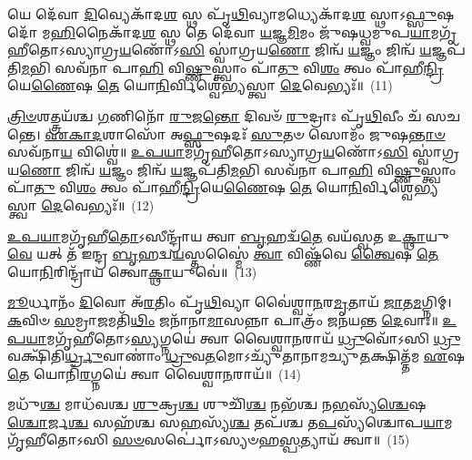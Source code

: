{\anuvakamend[{𑌤𑍞 𑌷𑌡𑍍𑌵𑌿𑍞᳴𑌶𑌤𑌿𑌃}]}%

𑌯𑍇 𑌦𑍇᳴𑌵𑌾 \ul{𑌦𑌿}\-𑌵𑍍𑌯𑍇𑌕𑌾᳴\-𑌦\-\ul{𑌶} 𑌸𑍍𑌥 𑌪𑍃᳴\-\ul{𑌥𑌿}\-𑌵𑍍𑌯𑌾𑌮𑌧𑍍𑌯𑍇𑌕𑌾᳴\-𑌦\-\ul{𑌶} 𑌸𑍍𑌥𑌾\-𑌽\-\ul{𑌫𑍍𑌸𑍁}\-𑌷𑌦𑍋᳴ 𑌮\-\ul{𑌹𑌿}\-𑌨𑍈𑌕𑌾᳴\-𑌦\-\ul{𑌶} 𑌸𑍍𑌥 𑌤𑍇 𑌦𑍇᳴𑌵𑌾 \ul{𑌯}\-𑌜𑍍𑌞\-\ul{𑌮𑌿}\-𑌮𑌂 𑌜𑍁᳴𑌷𑌧𑍍𑌵𑌮𑍁𑌪\-\ul{𑌯𑌾}\-𑌮𑌗𑍃᳴𑌹𑍀𑌤𑍋\-𑌽𑌸𑍍𑌯𑌾𑌗𑍍𑌰\-\ul{𑌯}\-𑌣𑍋᳴\-𑌽\-\ul{𑌸𑌿} 𑌸𑍍𑌵𑌾॑𑌗𑍍𑌰𑌯\-\ul{𑌣𑍋} 𑌜𑌿𑌨𑍍𑌵᳴ \ul{𑌯}\-𑌜𑍍𑌞𑌂 𑌜𑌿𑌨𑍍𑌵᳴ \ul{𑌯}\-𑌜𑍍𑌞𑌪᳴𑌤𑌿\-\ul{𑌮}\-𑌭𑌿 𑌸𑌵᳴𑌨𑌾 𑌪𑌾\-\ul{𑌹𑌿} 𑌵𑌿\-\ul{𑌷𑍍𑌣𑍁}\-𑌸𑍍𑌤𑍍𑌵𑌾𑌂 𑌪𑌾᳴\-\ul{𑌤𑍁} 𑌵𑌿\-\ul{𑌶𑌂} 𑌤𑍍𑌵𑌂 𑌪𑌾᳴𑌹𑍀\-\ul{𑌨𑍍𑌦𑍍𑌰𑌿}\-𑌯𑍇\-\ul{𑌣𑍈}\-𑌷 \ul{𑌤𑍇} 𑌯𑍋\-\ul{𑌨𑌿}\-𑌰𑍍𑌵𑌿𑌶𑍍𑌵𑍇॑𑌭𑍍𑌯𑌸𑍍𑌤𑍍𑌵𑌾 \ul{𑌦𑍇}\-𑌵𑍇𑌭𑍍𑌯𑌃᳴॥~(11)

{\anuvakamend[{𑌯𑍇 𑌦𑍇᳴\-\ul{𑌵𑌾}\-𑌸𑍍𑌤𑍍𑌰𑌿𑌚᳴𑌤𑍍𑌵𑌾𑌰𑌿𑍞𑌶𑌤𑍍}]}%

\-\ul{𑌤𑍍𑌰𑌿}\-\-\ul{𑍞}\-𑌶𑌤𑍍𑌤𑍍𑌰𑌯᳴𑌶𑍍𑌚 \ul{𑌗}\-𑌣𑌿𑌨𑍋᳴ \ul{𑌰𑍁}\-𑌜\-\ul{𑌨𑍍𑌤𑍋} 𑌦𑌿𑌵𑍞᳴ \ul{𑌰𑍁}\-𑌦𑍍𑌰𑌾𑌃 𑌪𑍃᳴\-\ul{𑌥𑌿}\-𑌵𑍀𑌂 𑌚᳴ 𑌸𑌚𑌨𑍍𑌤𑍇। \ul{𑌏}\-\-\ul{𑌕𑌾}\-\-\ul{𑌦}\-𑌶𑌾𑌸𑍋᳴ 𑌅\-\ul{𑌫𑍍𑌸𑍁}\-𑌷𑌦𑌃᳴ \ul{𑌸𑍁}\-𑌤𑍞 𑌸𑍋𑌮𑌂᳴ 𑌜𑍁𑌷\-\ul{𑌨𑍍𑌤𑌾}\-\-\ul{𑍞} 𑌸𑌵᳴𑌨𑌾\-\ul{𑌯} 𑌵𑌿𑌶𑍍𑌵𑍇॑॥ \ul{𑌉}\-\-\ul{𑌪}\-\-\ul{𑌯𑌾}\-𑌮𑌗𑍃᳴𑌹𑍀𑌤𑍋\-𑌽𑌸𑍍𑌯𑌾𑌗𑍍𑌰\-\ul{𑌯}\-𑌣𑍋᳴\-𑌽\-\ul{𑌸𑌿} 𑌸𑍍𑌵𑌾॑𑌗𑍍𑌰𑌯\-\ul{𑌣𑍋} 𑌜𑌿𑌨𑍍𑌵᳴ \ul{𑌯}\-𑌜𑍍𑌞𑌂 𑌜𑌿𑌨𑍍𑌵᳴ \ul{𑌯}\-𑌜𑍍𑌞𑌪᳴𑌤𑌿\-\ul{𑌮}\-𑌭𑌿 𑌸𑌵᳴𑌨𑌾 𑌪𑌾\-\ul{𑌹𑌿} 𑌵𑌿\-\ul{𑌷𑍍𑌣𑍁}\-𑌸𑍍𑌤𑍍𑌵𑌾𑌂 𑌪𑌾᳴\-\ul{𑌤𑍁} 𑌵𑌿\-\ul{𑌶𑌂} 𑌤𑍍𑌵𑌂 𑌪𑌾᳴𑌹𑍀\-\ul{𑌨𑍍𑌦𑍍𑌰𑌿}\-𑌯𑍇\-\ul{𑌣𑍈}\-𑌷 \ul{𑌤𑍇} 𑌯𑍋\-\ul{𑌨𑌿}\-𑌰𑍍𑌵𑌿𑌶𑍍𑌵𑍇॑𑌭𑍍𑌯𑌸𑍍𑌤𑍍𑌵𑌾 \ul{𑌦𑍇}\-𑌵𑍇𑌭𑍍𑌯𑌃᳴॥~(12)

{\anuvakamend[{\-\ul{𑌤𑍍𑌰𑌿}\-\-\ul{𑍞}\-𑌶𑌦𑍍 𑌦𑍍𑌵𑌿𑌚᳴𑌤𑍍𑌵𑌾𑌰𑌿𑍞𑌶𑌤𑍍}]}%

\-\ul{𑌉}\-\-\ul{𑌪}\-\-\ul{𑌯𑌾}\-𑌮𑌗𑍃᳴𑌹𑍀\-\ul{𑌤𑍋}\-\-𑌽𑌸𑍀𑌨𑍍𑌦𑍍𑌰𑌾᳴𑌯 𑌤𑍍𑌵𑌾 \ul{𑌬𑍃}\-𑌹𑌦𑍍𑌵᳴\-\ul{𑌤𑍇} 𑌵𑌯᳴𑌸𑍍𑌵𑌤 𑌉\-\ul{𑌕𑍍𑌥𑌾}\-𑌯𑍁\-\ul{𑌵𑍇} 𑌯𑌤𑍍 𑌤᳴ 𑌇𑌨𑍍𑌦𑍍𑌰 \ul{𑌬𑍃}\-𑌹𑌦𑍍𑌵\-\ul{𑌯}\-𑌸𑍍𑌤𑌸𑍍𑌮𑍈॑ \ul{𑌤𑍍𑌵𑌾} 𑌵𑌿𑌷𑍍𑌣᳴𑌵𑍇 \ul{𑌤𑍍𑌵𑍈}\-𑌷 \ul{𑌤𑍇} 𑌯𑍋\-\ul{𑌨𑌿}\-𑌰𑌿𑌨𑍍𑌦𑍍𑌰𑌾᳴𑌯 𑌤𑍍𑌵𑍋\-\ul{𑌕𑍍𑌥𑌾}\-𑌯𑍁𑌵𑍇॑॥~(13)

{\anuvakamend[{\-\ul{𑌉}\-\-\ul{𑌪}\-\-\ul{𑌯𑌾}\-𑌮𑌗𑍃᳴𑌹𑍀\-\ul{𑌤𑍋} 𑌦𑍍𑌵𑌾𑌵𑌿𑍞᳴𑌶𑌤𑌿𑌃}]}%

\-\ul{𑌮𑍂}\-𑌰𑍍𑌧𑌾𑌨𑌂᳴ \ul{𑌦𑌿}\-𑌵𑍋 𑌅᳴\-\ul{𑌰}\-𑌤𑌿𑌂 𑌪𑍃᳴\-\ul{𑌥𑌿}\-𑌵𑍍𑌯𑌾 𑌵𑍈॑𑌶𑍍𑌵𑌾\-\ul{𑌨}\-𑌰\-\ul{𑌮𑍃}\-𑌤𑌾𑌯᳴ \ul{𑌜𑌾}\-𑌤\-\ul{𑌮}\-𑌗𑍍𑌨𑌿𑌮𑍍। \ul{𑌕}\-𑌵𑌿𑍞 \ul{𑌸}\-𑌮𑍍𑌰𑌾\-\ul{𑌜}\-𑌮𑌤𑌿᳴\-\ul{𑌥𑌿𑌂} 𑌜𑌨𑌾᳴𑌨𑌾\-\ul{𑌮𑌾}\-𑌸𑌨𑍍𑌨𑌾 𑌪𑌾𑌤𑍍𑌰𑌂᳴ 𑌜𑌨𑌯𑌨𑍍𑌤 \ul{𑌦𑍇}\-𑌵𑌾𑌃॥ \ul{𑌉}\-\-\ul{𑌪}\-\-\ul{𑌯𑌾}\-𑌮𑌗𑍃᳴𑌹𑍀𑌤𑍋\-𑌽\-\ul{𑌸𑍍𑌯}\-𑌗𑍍𑌨𑌯𑍇॑ 𑌤𑍍𑌵𑌾 𑌵𑍈𑌶𑍍𑌵𑌾\-\ul{𑌨}\-𑌰𑌾𑌯᳴ \ul{𑌧𑍍𑌰𑍁}\-𑌵𑍋᳴\-𑌽𑌸𑌿 \ul{𑌧𑍍𑌰𑍁}\-𑌵𑌕𑍍𑌷𑌿᳴𑌤𑌿\-\ul{𑌰𑍍𑌧𑍍𑌰𑍁}\-𑌵𑌾𑌣𑌾𑌂॑ \ul{𑌧𑍍𑌰𑍁}\-𑌵\-\ul{𑌤}\-𑌮𑍋\-𑌽𑌚𑍍𑌯𑍁᳴𑌤𑌾𑌨𑌾𑌮𑌚𑍍𑌯𑍁\-\ul{𑌤}\-𑌕𑍍𑌷𑌿𑌤𑍍𑌤᳴𑌮 \ul{𑌏}\-𑌷 \ul{𑌤𑍇} 𑌯𑍋𑌨𑌿᳴\-\ul{𑌰}\-𑌗𑍍𑌨𑌯𑍇॑ 𑌤𑍍𑌵𑌾 𑌵𑍈𑌶𑍍𑌵𑌾\-\ul{𑌨}\-𑌰𑌾𑌯᳴॥~(14)

{\anuvakamend[{\-\ul{𑌮𑍂}\-𑌰𑍍𑌧𑌾\-\ul{𑌨𑌂} 𑌪𑌞𑍍𑌚᳴𑌤𑍍𑌰𑌿𑍞𑌶𑌤𑍍}]}%

𑌮𑌧𑍁᳴\-\ul{𑌶𑍍𑌚} 𑌮𑌾𑌧᳴𑌵𑌶𑍍𑌚 \ul{𑌶𑍁}\-𑌕𑍍𑌰\-\ul{𑌶𑍍𑌚} 𑌶𑍁𑌚𑌿᳴\-\ul{𑌶𑍍𑌚} 𑌨𑌭᳴𑌶𑍍𑌚 𑌨\-\ul{𑌭}\-𑌸𑍍𑌯᳴\-\ul{𑌶𑍍𑌚𑍇}\-𑌷\-\ul{𑌶𑍍𑌚𑍋}\-𑌰𑍍𑌜\-\ul{𑌶𑍍𑌚} 𑌸𑌹᳴𑌶𑍍𑌚 𑌸\-\ul{𑌹}\-𑌸𑍍𑌯᳴\-\ul{𑌶𑍍𑌚} 𑌤𑌪᳴𑌶𑍍𑌚 𑌤\-\ul{𑌪}\-𑌸𑍍𑌯᳴𑌶𑍍𑌚𑍋𑌪\-\ul{𑌯𑌾}\-𑌮𑌗𑍃᳴𑌹𑍀𑌤𑍋\-𑌽𑌸𑌿 \ul{𑌸}\-\-\ul{𑍞}\-𑌸𑌰𑍍𑌪𑍋॑\-𑌽𑌸𑍍𑌯𑍞𑌹\-\ul{𑌸𑍍𑌪}\-𑌤𑍍𑌯𑌾𑌯᳴ 𑌤𑍍𑌵𑌾॥~(15)

